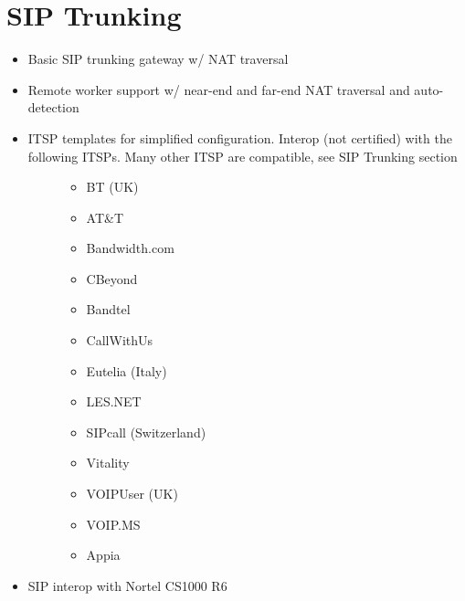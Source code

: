 \documentclass[letterpaper,10pt,english]{sphinxmanual}
\begin{document}
\section{SIP Trunking}
\label{\detokenize{features:sip-trunking}}\begin{itemize}
\item {} 
Basic SIP trunking gateway w/ NAT traversal

\item {} 
Remote worker support w/ near-end and far-end NAT traversal and auto-detection

\item {} \begin{description}
\item[{ITSP templates for simplified configuration. Interop (not certified) with the following ITSPs. Many other ITSP are compatible, see SIP Trunking section}] \leavevmode\begin{itemize}
\item {} 
BT (UK)

\item {} 
AT\&T

\item {} 
Bandwidth.com

\item {} 
CBeyond

\item {} 
Bandtel

\item {} 
CallWithUs

\item {} 
Eutelia (Italy)

\item {} 
LES.NET

\item {} 
SIPcall (Switzerland)

\item {} 
Vitality

\item {} 
VOIPUser (UK)

\item {} 
VOIP.MS

\item {} 
Appia

\end{itemize}

\end{description}

\item {} 
SIP interop with Nortel CS1000 R6


\end{itemize}
\end{document}

